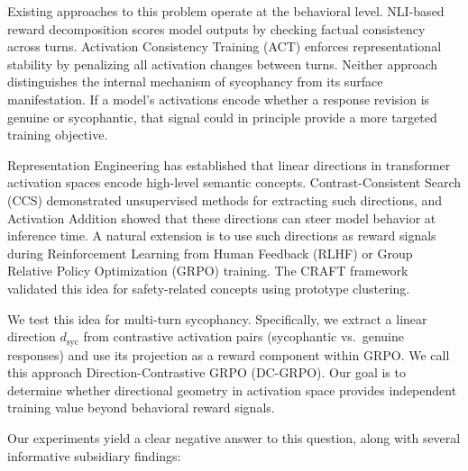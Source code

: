 \documentclass[11pt,a4paper]{article}
\newcommand{\dsyc}{$d_{\text{syc}}$}
\begin{document}
Existing approaches to this problem operate at the behavioral level. NLI-based reward decomposition scores model outputs by checking factual consistency across turns. Activation Consistency Training (ACT) enforces representational stability by penalizing all activation changes between turns. Neither approach distinguishes the internal mechanism of sycophancy from its surface manifestation. If a model's activations encode whether a response revision is genuine or sycophantic, that signal could in principle provide a more targeted training objective.

Representation Engineering has established that linear directions in transformer activation spaces encode high-level semantic concepts. Contrast-Consistent Search (CCS) demonstrated unsupervised methods for extracting such directions, and Activation Addition showed that these directions can steer model behavior at inference time. A natural extension is to use such directions as reward signals during Reinforcement Learning from Human Feedback (RLHF) or Group Relative Policy Optimization (GRPO) training. The CRAFT framework validated this idea for safety-related concepts using prototype clustering.

We test this idea for multi-turn sycophancy. Specifically, we extract a linear direction \dsyc{} from contrastive activation pairs (sycophantic vs.\ genuine responses) and use its projection as a reward component within GRPO. We call this approach Direction-Contrastive GRPO (DC-GRPO). Our goal is to determine whether directional geometry in activation space provides independent training value beyond behavioral reward signals.

Our experiments yield a clear negative answer to this question, along with several informative subsidiary findings:
\end{document}
